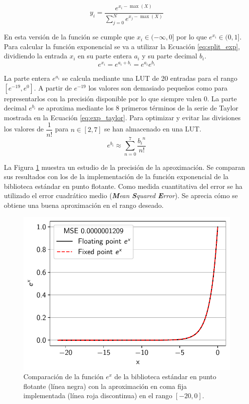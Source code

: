 \begin{equation} \label{eq:softmax_neg}
y_i = \dfrac{e^{x_i - \max(X)}}{\sum_{j = 0}^N e^{x_j - \max(X)}}
\end{equation}

En esta versión de la función se cumple que $x_i \in (-\infty, 0]$ por lo que $e^{x_i} \in (0,1]$. Para calcular la función exponencial se va a utilizar la Ecuación \ref{eq:split_exp}, dividiendo la entrada $x_i$ en su parte entera $a_i$ y su parte decimal $b_i$.
\begin{equation} \label{eq:split_exp}
e^{x_i} = e^{a_i+b_i} = e^{a_i} e^{b_i}
\end{equation}

La parte entera $e^{a_i}$ se calcula mediante una LUT de 20 entradas para el rango $[e^{-19}, e^{0}]$. A partir de $e^{-19}$ los valores son demasiado pequeños como para representarlos con la precisión disponible por lo que siempre valen $0$. La parte decimal $e^{b_i}$ se aproxima mediante los 8 primeros términos de la serie de Taylor mostrada en la Ecuación \ref{eq:exp_taylor}. Para optimizar y evitar las divisiones los valores de $\dfrac{1}{n!}$ para $n \in [2,7]$ se han almacenado en una LUT.
\begin{equation} \label{eq:exp_taylor}
e^{b_i} \approx \sum_{n=0}^{7} \dfrac{{b_i}^n}{n!}
\end{equation}

La Figura \ref{fig:exp_aprox} muestra un estudio de la precisión de la aproximación. Se comparan sus resultados con los de la implementación de la función exponencial de la biblioteca estándar en punto flotante. Como medida cuantitativa del error se ha utilizado el error cuadrático medio (\textit{\textbf{M}ean \textbf{S}quared \textbf{E}rror}). Se aprecia cómo se obtiene una buena aproximación en el rango deseado.

\begin{figure}[h]
	\centering
	\includegraphics[width=0.55\linewidth]{root/Imagenes/bnn_lib/exp_aprox.pdf}
	\caption{Comparación de la función $e^x$ de la biblioteca estándar en punto flotante (línea negra) con la aproximación en coma fija implementada (línea roja discontinua) en el rango $[-20,0]$.}
	\label{fig:exp_aprox}
\end{figure}

